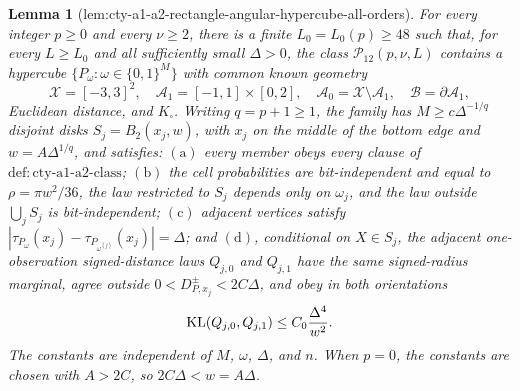 \documentclass{article}
\newtheorem{lemma}{Lemma}
\begin{document}
\begin{lemma}[lem:cty-a1-a2-rectangle-angular-hypercube-all-orders]\label{lem:cty-a1-a2-rectangle-angular-hypercube-all-orders}
For every integer \(p\geq0\) and every \(\nu\geq2\), there is a finite \(L_0=L_0(p)\geq48\) such that, for every \(L\geq L_0\) and all sufficiently small \(\Delta>0\), the class \(\mathcal P_{12}(p,\nu,L)\) contains a hypercube \(\{P_\omega:\omega\in\{0,1\}^M\}\) with common known geometry
\[
 \mathcal X=[-3,3]^2,
 \quad \mathcal A_1=[-1,1]\times[0,2],
 \quad \mathcal A_0=\mathcal X\setminus\mathcal A_1,
 \quad \mathcal B=\partial\mathcal A_1,
\]
Euclidean distance, and \(K_\square\).  Writing \(q=p+1\geq1\), the family has \(M\geq c\Delta^{-1/q}\) disjoint disks \(S_j=B_2(x_j,w)\), with \(x_j\) on the middle of the bottom edge and \(w=A\Delta^{1/q}\), and satisfies: \(\mathrm{(a)}\) every member obeys every clause of \(\mathrm{def:cty\text{-}a1\text{-}a2\text{-}class}\); \(\mathrm{(b)}\) the cell probabilities are bit-independent and equal to \(\rho=\pi w^2/36\), the law restricted to \(S_j\) depends only on \(\omega_j\), and the law outside \(\bigcup_jS_j\) is bit-independent; \(\mathrm{(c)}\) adjacent vertices satisfy \(|\tau_{P_\omega}(x_j)-\tau_{P_{\omega^{(j)}}}(x_j)|=\Delta\); and \(\mathrm{(d)}\), conditional on \(X\in S_j\), the adjacent one-observation signed-distance laws \(Q_{j,0}\) and \(Q_{j,1}\) have the same signed-radius marginal, agree outside \(0<D^{\pm}_{P,x_j}<2C\Delta\), and obey in both orientations
\[
 \operatorname{KL}(Q_{j,0},Q_{j,1})\leq C_0{\Delta^4\over w^2}.
\]
The constants are independent of \(M\), \(\omega\), \(\Delta\), and \(n\).  When \(p=0\), the constants are chosen with \(A>2C\), so \(2C\Delta<w=A\Delta\).
\end{lemma}
\end{document}
